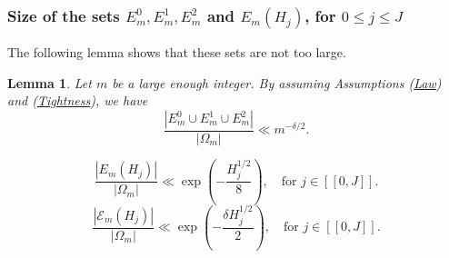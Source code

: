 \documentclass[12pt]{amsart}
\newtheorem{lem}[thm]{Lemma}
\theoremstyle{definition}
\numberwithin{equation}{section}
\numberwithin{equation}{section}
\def\Ecal{\mathcal{E}}
\begin{document}
\subsubsection{Size of the sets $E^0_m, E^1_m, E^2_m$ and $E_m(H_j)$, for $0\leq j\leq J$}
The following lemma shows that these sets are not too large.
\begin{lem}\label{lem card set E(H)} Let $m$ be a large enough integer. By assuming Assumptions (\hyperlink{Ass Law}{Law}) and (\hyperlink{Ass Tightness}{Tightness}), we have 
\begin{equation}\label{eq bound E^1,2,3}
\frac{|E^0_m \cup E^1_m\cup E^2_m|}{|\Omega_m|}\ll m^{-\delta/2}.
\end{equation}

\begin{equation}\label{eq bound E(H j)}
\frac{|E_m(H_j)|}{|\Omega_m|}\ll 
 \exp\left(-\frac{H_j^{1/2}}{8}\right), \quad\text{for  } j \in [\![ 0,J ]\!]  .
\end{equation}
\begin{equation}\label{eq bound Ecal(H_0)}
\frac{|\Ecal_m(H_j)|}{|\Omega_m|}\ll 
\exp\left(-\frac{\delta H_j^{1/2}}{2}\right), \quad\text{for  } j \in [\![ 0,J ]\!]  .
\end{equation}
\end{lem}
\end{document}
